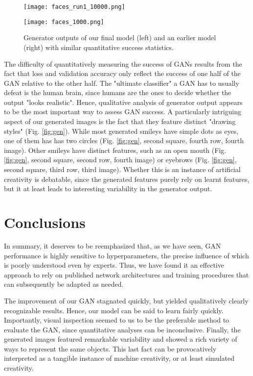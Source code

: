 \documentclass[11pt]{article}
\begin{document}
\begin{figure}[ht]
 \centering
 \begin{minipage}[b]{0.4\textwidth}
   \texttt{[image: faces\_run1\_10000.png]}
 \end{minipage}
   \begin{minipage}[b]{0.4\textwidth}
   \texttt{[image: faces\_1000.png]}
 \end{minipage}
 \caption{Generator outputs of our final model (left) and an earlier model (right) with similar quantitative success statistics.}
 \label{fig:good_vs_bad}
\end{figure}

\clearpage

The difficulty of quantitatively measuring the success of GANs results from the fact that loss and validation accuracy only reflect the success of one half of the GAN relative to the other half. The "ultimate classifier" a GAN has to usually defeat is the human brain, since humans are the ones to decide whether the output "looks realistic". Hence, qualitative analysis of generator output appears to be the most important way to assess GAN success. A particularly intriguing aspect of our generated images is the fact that they feature distinct "drawing styles" (Fig. \ref{fig:gen}). While most generated smileys have simple dots as eyes, one of them has has two circles (Fig. \ref{fig:gen}, second square, fourth row, fourth image). Other smileys have distinct features, such as an open mouth (Fig. \ref{fig:gen}, second square, second row, fourth image) or eyebrows (Fig. \ref{fig:gen}, second square, third row, third image). Whether this is an instance of artificial creativity is debatable, since the generated features purely rely on learnt features, but it at least leads to interesting variability in the generator output.

\section{Conclusions}
\begin{comment}
This section should sum up what you did and what you found.
\end{comment}

In summary, it deserves to be reemphasized that, as we have seen, GAN performance is highly sensitive to hyperparameters, the precise influence of which is poorly understood even by experts. Thus, we have found it an effective approach to rely on published network architectures and training procedures that can subsequently be adapted as needed.

The improvement of our GAN stagnated quickly, but yielded qualitatively clearly recognizable results. Hence, our model can be said to learn fairly quickly. Importantly, visual inspection seemed to us to be the preferable method to evaluate the GAN, since quantitative analyses can be inconclusive. Finally, the generated images featured remarkable variability and showed a rich variety of ways to represent the same objects. This last fact can be provocatively interpreted as a tangible instance of machine creativity, or at least simulated creativity.

\clearpage

\printbibliography
\end{document}
